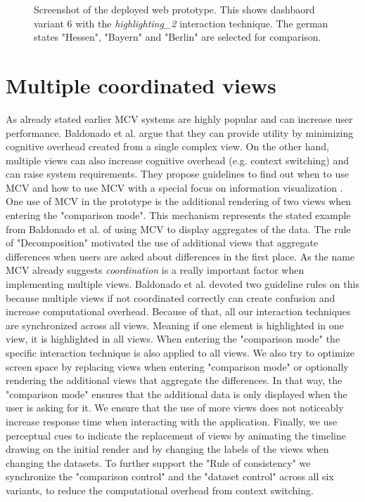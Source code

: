 \begin{figure}[ht]
    \centering
    \caption{Screenshot of the deployed web prototype. This shows dashbaord variant 6 with the \textit{highlighting\_2} interaction technique. The german states "Hessen", "Bayern" and "Berlin" are selected for comparison.} \label{prototypeScreenshot}
\end{figure}

\section{Multiple coordinated views}
As already stated earlier MCV systems are highly popular and can increase user performance. Baldonado et al. argue that they can provide utility
by minimizing cognitive overhead created from a single complex view. On the other hand, multiple views can also increase cognitive overhead
(e.g. context switching) and can raise system requirements. They propose guidelines to find out when to use MCV and how to use MCV
with a special focus on information visualization \citep*{WangBaldonado.2000}. One use of MCV in the prototype is the additional rendering of
two views when entering the "comparison mode". This mechanism represents the stated example from Baldonado et al. of using MCV to display
aggregates of the data. The rule of "Decomposition" motivated the use of additional views that aggregate differences when users are asked
about differences in the first place. As the name MCV already suggests \textit{coordination} is a really important factor when implementing
multiple views. Baldonado et al. devoted two guideline rules on this because multiple views if not coordinated correctly can create
confusion and increase computational overhead. Because of that, all our interaction techniques are synchronized across all views. Meaning if one
element is highlighted in one view, it is highlighted in all views. When entering the "comparison mode" the specific interaction technique
is also applied to all views. We also try to optimize screen space by replacing views when entering "comparison mode" or optionally rendering
the additional views that aggregate the differences. In that way, the "comparison mode" ensures that the additional data is only displayed when the
user is asking for it. We ensure that the use of more views does not noticeably increase
response time when interacting with the application. Finally, we use perceptual cues to indicate the replacement of views by animating
the timeline drawing on the initial render and by changing the labels of the views when changing the datasets. 
To further support the "Rule of consistency" we synchronize the "comparison control" and the "dataset control" across all six variants, to reduce
the computational overhead from context switching.

